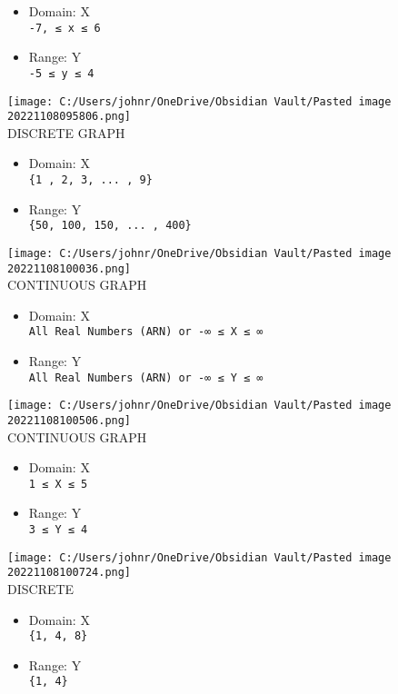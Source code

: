 \documentclass[
]{article}
\providecommand{\tightlist}{%
  \setlength{\itemsep}{0pt}\setlength{\parskip}{0pt}}
\begin{document}
\begin{itemize}
\tightlist
\item
  Domain: X\\
  \texttt{-7,\ ≤\ x\ ≤\ 6}
\item
  Range: Y\\
  \texttt{-5\ ≤\ y\ ≤\ 4}
\end{itemize}

\texttt{[image: C:/Users/johnr/OneDrive/Obsidian Vault/Pasted image 20221108095806.png]}\\
DISCRETE GRAPH

\begin{itemize}
\tightlist
\item
  Domain: X\\
  \texttt{\{1\ ,\ 2,\ 3,\ ...\ ,\ 9\}}
\item
  Range: Y\\
  \texttt{\{50,\ 100,\ 150,\ ...\ ,\ 400\}}
\end{itemize}

\texttt{[image: C:/Users/johnr/OneDrive/Obsidian Vault/Pasted image 20221108100036.png]}\\
CONTINUOUS GRAPH

\begin{itemize}
\tightlist
\item
  Domain: X\\
  \texttt{All\ Real\ Numbers\ (ARN)\ or\ -∞\ ≤\ X\ ≤\ ∞}
\item
  Range: Y\\
  \texttt{All\ Real\ Numbers\ (ARN)\ or\ -∞\ ≤\ Y\ ≤\ ∞}
\end{itemize}

\texttt{[image: C:/Users/johnr/OneDrive/Obsidian Vault/Pasted image 20221108100506.png]}\\
CONTINUOUS GRAPH

\begin{itemize}
\tightlist
\item
  Domain: X\\
  \texttt{1\ ≤\ X\ ≤\ 5}
\item
  Range: Y\\
  \texttt{3\ ≤\ Y\ ≤\ 4}
\end{itemize}

\texttt{[image: C:/Users/johnr/OneDrive/Obsidian Vault/Pasted image 20221108100724.png]}\\
DISCRETE

\begin{itemize}
\tightlist
\item
  Domain: X\\
  \texttt{\{1,\ 4,\ 8\}}
\item
  Range: Y\\
  \texttt{\{1,\ 4\}}
\end{itemize}
\end{document}

